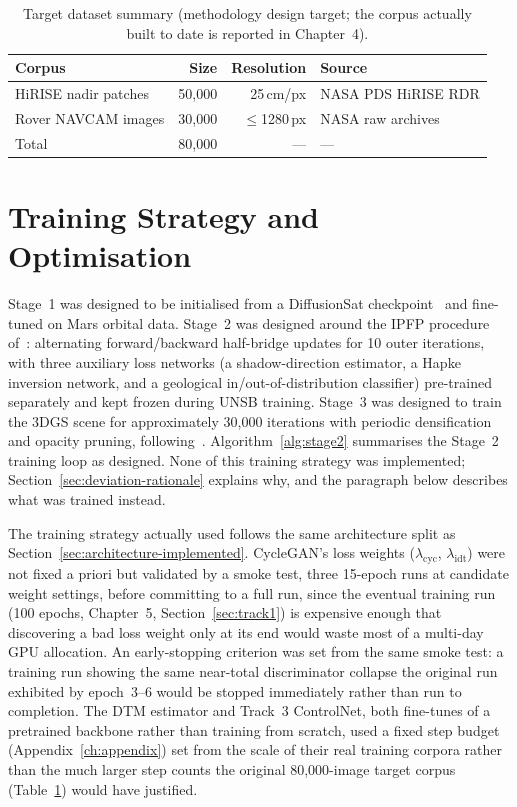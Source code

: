 \begin{table}[H]
  \caption{Target dataset summary (methodology design target; the corpus actually built to date is reported in Chapter~4).}
  \label{tab:dataset}
  \centering
  \begin{tabular}{lrrl}
    \toprule
    Corpus & Size & Resolution & Source \\
    \midrule
    HiRISE nadir patches  & 50{,}000 & 25\,cm/px & NASA PDS HiRISE RDR \\
    Rover NAVCAM images   & 30{,}000 & $\leq$1280\,px & NASA raw archives \\
    \midrule
    Total                 & 80{,}000 & ---         & --- \\
    \bottomrule
  \end{tabular}
\end{table}

\section{Training Strategy and Optimisation}
\label{sec:training}

Stage~1 was designed to be initialised from a DiffusionSat checkpoint~\cite{khanna2024diffusionsat} and fine-tuned on Mars orbital data. Stage~2 was designed around the IPFP procedure of~\cite{kim2024unsb}: alternating forward/backward half-bridge updates for 10 outer iterations, with three auxiliary loss networks (a shadow-direction estimator, a Hapke inversion network, and a geological in/out-of-distribution classifier) pre-trained separately and kept frozen during UNSB training. Stage~3 was designed to train the 3DGS scene for approximately 30,000 iterations with periodic densification and opacity pruning, following~\cite{kerbl2023gaussian}. Algorithm~\ref{alg:stage2} summarises the Stage~2 training loop as designed. None of this training strategy was implemented; Section~\ref{sec:deviation-rationale} explains why, and the paragraph below describes what was trained instead.

The training strategy actually used follows the same architecture split as Section~\ref{sec:architecture-implemented}. CycleGAN's loss weights ($\lambda_{\mathrm{cyc}}$, $\lambda_{\mathrm{idt}}$) were not fixed a priori but validated by a smoke test, three 15-epoch runs at candidate weight settings, before committing to a full run, since the eventual training run (100 epochs, Chapter~5, Section~\ref{sec:track1}) is expensive enough that discovering a bad loss weight only at its end would waste most of a multi-day GPU allocation. An early-stopping criterion was set from the same smoke test: a training run showing the same near-total discriminator collapse the original run exhibited by epoch~3--6 would be stopped immediately rather than run to completion. The DTM estimator and Track~3 ControlNet, both fine-tunes of a pretrained backbone rather than training from scratch, used a fixed step budget (Appendix~\ref{ch:appendix}) set from the scale of their real training corpora rather than the much larger step counts the original 80,000-image target corpus (Table~\ref{tab:dataset}) would have justified.

